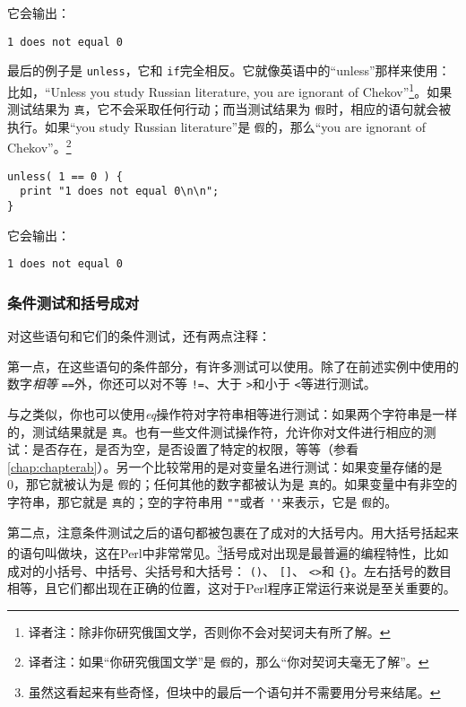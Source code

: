 它会输出：

\begin{lstlisting}
1 does not equal 0
\end{lstlisting}

最后的例子是 \verb|unless|，它和 \verb|if|完全相反。它就像英语中的“unless”那样来使用：比如，“Unless you study Russian literature, you are ignorant of Chekov”\footnote{译者注：除非你研究俄国文学，否则你不会对契诃夫有所了解。}。如果测试结果为 \verb|真|，它不会采取任何行动；而当测试结果为 \verb|假|时，相应的语句就会被执行。如果“you study Russian literature”是 \verb|假|的，那么“you are ignorant of Chekov”。\footnote{译者注：如果“你研究俄国文学”是 \verb|假|的，那么“你对契诃夫毫无了解”。}

\begin{lstlisting}
unless( 1 == 0 ) {
  print "1 does not equal 0\n\n";
}
\end{lstlisting}

它会输出：

\begin{lstlisting}
1 does not equal 0
\end{lstlisting}

\subsubsection{条件测试和括号成对}
对这些语句和它们的条件测试，还有两点注释：

第一点，在这些语句的条件部分，有许多测试可以使用。除了在前述实例中使用的数字\textit{相等} \verb|==|外，你还可以对不等 \verb|!=|、大于 \verb|>|和小于 \verb|<|等进行测试。

与之类似，你也可以使用\textit{eq}操作符对字符串相等进行测试：如果两个字符串是一样的，测试结果就是 \verb|真|。也有一些文件测试操作符，允许你对文件进行相应的测试：是否存在，是否为空，是否设置了特定的权限，等等（参看\autoref{chap:chapterab}）。另一个比较常用的是对变量名进行测试：如果变量存储的是0，那它就被认为是 \verb|假|的；任何其他的数字都被认为是 \verb|真|的。如果变量中有非空的字符串，那它就是 \verb|真|的；空的字符串用 \verb|""|或者 \verb|''|来表示，它是 \verb|假|的。

第二点，注意条件测试之后的语句都被包裹在了成对的大括号内。用大括号括起来的语句叫做块，这在Perl中非常常见。\footnote{虽然这看起来有些奇怪，但块中的最后一个语句并不需要用分号来结尾。}括号成对出现是最普遍的编程特性，比如成对的小括号、中括号、尖括号和大括号： \verb|()|、 \verb|[]|、 \verb|<>|和 \verb|{}|。左右括号的数目相等，且它们都出现在正确的位置，这对于Perl程序正常运行来说是至关重要的。

